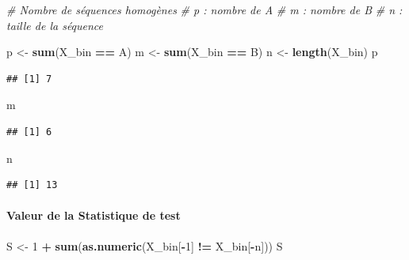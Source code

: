 \documentclass[
  12pt,
]{article}
\newenvironment{Shaded}{\begin{snugshade}}{\end{snugshade}}
\newcommand{\CommentTok}[1]{\textcolor[rgb]{0.56,0.35,0.01}{\textit{#1}}}
\newcommand{\DecValTok}[1]{\textcolor[rgb]{0.00,0.00,0.81}{#1}}
\newcommand{\FunctionTok}[1]{\textcolor[rgb]{0.13,0.29,0.53}{\textbf{#1}}}
\newcommand{\NormalTok}[1]{#1}
\newcommand{\OtherTok}[1]{\textcolor[rgb]{0.56,0.35,0.01}{#1}}
\newcommand{\SpecialCharTok}[1]{\textcolor[rgb]{0.81,0.36,0.00}{\textbf{#1}}}
\newcommand{\StringTok}[1]{\textcolor[rgb]{0.31,0.60,0.02}{#1}}
\begin{document}
\begin{Shaded}
\begin{Highlighting}[]
\CommentTok{\# Nombre de séquences homogènes}
\CommentTok{\# p : nombre de A}
\CommentTok{\# m : nombre de B}
\CommentTok{\# n : taille de la séquence}

\NormalTok{p }\OtherTok{\textless{}{-}} \FunctionTok{sum}\NormalTok{(X\_bin }\SpecialCharTok{==} \StringTok{\textquotesingle{}A\textquotesingle{}}\NormalTok{)}
\NormalTok{m }\OtherTok{\textless{}{-}} \FunctionTok{sum}\NormalTok{(X\_bin }\SpecialCharTok{==} \StringTok{\textquotesingle{}B\textquotesingle{}}\NormalTok{)}
\NormalTok{n }\OtherTok{\textless{}{-}} \FunctionTok{length}\NormalTok{(X\_bin)}
\NormalTok{p}
\end{Highlighting}
\end{Shaded}

\begin{verbatim}
## [1] 7
\end{verbatim}

\begin{Shaded}
\begin{Highlighting}[]
\NormalTok{m}
\end{Highlighting}
\end{Shaded}

\begin{verbatim}
## [1] 6
\end{verbatim}

\begin{Shaded}
\begin{Highlighting}[]
\NormalTok{n}
\end{Highlighting}
\end{Shaded}

\begin{verbatim}
## [1] 13
\end{verbatim}

\paragraph{Valeur de la Statistique de
test}\label{valeur-de-la-statistique-de-test}

\begin{Shaded}
\begin{Highlighting}[]
\NormalTok{S }\OtherTok{\textless{}{-}} \DecValTok{1} \SpecialCharTok{+} \FunctionTok{sum}\NormalTok{(}\FunctionTok{as.numeric}\NormalTok{(X\_bin[}\SpecialCharTok{{-}}\DecValTok{1}\NormalTok{] }\SpecialCharTok{!=}\NormalTok{ X\_bin[}\SpecialCharTok{{-}}\NormalTok{n]))}
\NormalTok{S}
\end{Highlighting}
\end{Shaded}
\end{document}
